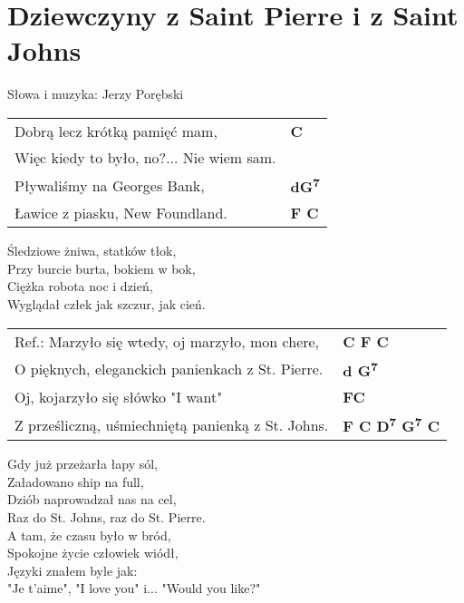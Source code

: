 \section{Dziewczyny z Saint Pierre i z Saint Johns}

Słowa i muzyka: Jerzy Porębski

\vspace{2em}
\begin{tabular}{@{}p{10cm}@{}l@{}}
Dobrą lecz krótką pamięć mam, & \bfseries C\\
Więc kiedy to było, no?... Nie wiem sam. \\
Pływaliśmy na Georges Bank, & \bfseries dG\textsuperscript{7}\\
Ławice z piasku, New Foundland. & \bfseries F C\\
\end{tabular}

\vspace{1em}
Śledziowe żniwa, statków tłok, \\
Przy burcie burta, bokiem w bok, \\
Ciężka robota noc i dzień, \\
Wyglądał człek jak szczur, jak cień. \\

\begin{tabular}{@{}p{10cm}@{}l@{}}
Ref.: Marzyło się wtedy, oj marzyło, mon chere, & \bfseries C F C\\
O pięknych, eleganckich panienkach z St. Pierre. & \bfseries d G\textsuperscript{7}\\
Oj, kojarzyło się słówko "I want" & \bfseries FC\\
Z prześliczną, uśmiechniętą panienką z St. Johns. & \bfseries F C D\textsuperscript{7} G\textsuperscript{7} C\\
\end{tabular}

\vspace{1em}
Gdy już przeżarła łapy sól, \\
Załadowano ship na full, \\
Dziób naprowadzał nas na cel, \\
Raz do St. Johns, raz do St. Pierre. \\

A tam, że czasu było w bród, \\
Spokojne życie człowiek wiódł, \\
Języki znałem byle jak: \\
"Je t'aime", "I love you" i... "Would you like?" \\

